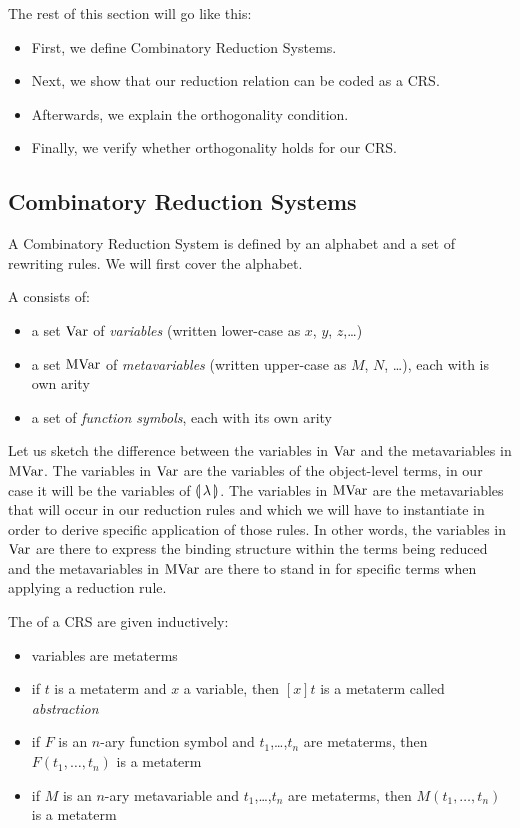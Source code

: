 The rest of this section will go like this:
\begin{itemize}
\item First, we define Combinatory Reduction Systems.
\item Next, we show that our reduction relation can be coded as a CRS.
\item Afterwards, we explain the orthogonality condition.
\item Finally, we verify whether orthogonality holds for our CRS.
\end{itemize}


\subsection{Combinatory Reduction Systems}
\label{ssec:crs}

A Combinatory Reduction System is defined by an alphabet and a set of
rewriting rules. We will first cover the alphabet.

\begin{definition}
  A  consists of:
  \begin{itemize}
  \item a set $\operatorname{Var}$ of \emph{variables} (written lower-case as $x$, $y$,
    $z$,\ldots)
  \item a set $\operatorname{MVar}$ of \emph{metavariables} (written upper-case as $M$,
    $N$, \ldots), each with is own arity
  \item a set of \emph{function symbols}, each with its own arity
  \end{itemize}
\end{definition}

Let us sketch the difference between the variables in $\operatorname{Var}$ and the
metavariables in $\operatorname{MVar}$. The variables in $\operatorname{Var}$ are the variables of the
object-level terms, in our case it will be the variables of
$\llparenthesis \, \lambda \, \rrparenthesis$. The variables in $\operatorname{MVar}$ are the metavariables that
will occur in our reduction rules and which we will have to instantiate in
order to derive specific application of those rules. In other words, the
variables in $\operatorname{Var}$ are there to express the binding structure within the
terms being reduced and the metavariables in $\operatorname{MVar}$ are there to stand in
for specific terms when applying a reduction rule.

\begin{definition}
  The  of a CRS are given inductively:
  \begin{itemize}
  \item variables are metaterms
  \item if $t$ is a metaterm and $x$ a variable, then $[x]t$ is a metaterm
    called \emph{abstraction}
  \item if $F$ is an $n$-ary function symbol and $t_1$,\ldots,$t_n$ are
    metaterms, then $F(t_1,\ldots,t_n)$ is a metaterm
  \item if $M$ is an $n$-ary metavariable and $t_1$,\ldots,$t_n$ are
    metaterms, then $M(t_1,\ldots,t_n)$ is a metaterm
  \end{itemize}
\end{definition}

